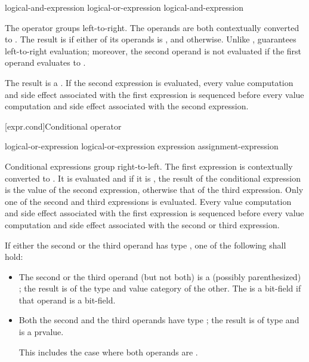\begin{bnf}
\br
    logical-and-expression\br
    logical-or-expression \terminal{||} logical-and-expression
\end{bnf}

\pnum
The \tcode{||} operator groups left-to-right. The operands are both
contextually converted to .
The result is
 if either of its operands is , and
 otherwise. Unlike \tcode{|}, \tcode{||} guarantees
left-to-right evaluation; moreover, the second operand is not evaluated
if the first operand evaluates to .

\pnum
The result is a .
%
If the second expression is evaluated, every
%
value computation and
%
side effect
associated with the first expression is sequenced before every value computation
and side effect associated with the second expression.

[expr.cond]{Conditional operator}%
%
%
%

\begin{bnf}
\br
    logical-or-expression\br
    logical-or-expression  expression \terminal{:} assignment-expression
\end{bnf}

\pnum
Conditional expressions group right-to-left. The first expression is
contextually converted to .
It is
evaluated and if it is , the result of the conditional
expression is the value of the second expression, otherwise that of the
third expression. Only one of the second and third expressions is
evaluated. Every
%
value computation and side effect associated with the
first expression is sequenced before every value computation and side
effect associated with the second or third expression.

\pnum
If either the second or the third operand has type ,
one of the following shall hold:
\begin{itemize}
%
\item The second or the third operand (but not both) is a (possibly
parenthesized) ; the result
is of the type and value category of the other.
The 
is a bit-field if that operand is a bit-field.

\item Both the second and the third operands have type ; the
result is of type  and is a prvalue.
\begin{note}
This
includes the case where both operands are .
\end{note}
\end{itemize}

